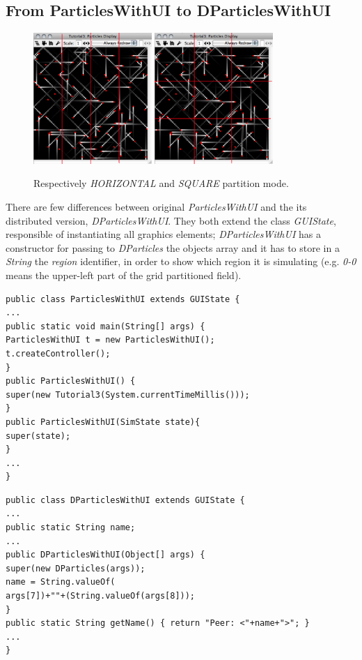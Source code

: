 \documentclass[12pt]{article}
\begin{document}
\subsection{From ParticlesWithUI to DParticlesWithUI}
\begin{figure}
\centering
\includegraphics[width=0.4\textwidth,bb=0 0 470 520]{particles-h.png} 
\includegraphics[width=0.4\textwidth,bb=0 0 470 520]{particles-m.png}
\caption{Respectively \textit{HORIZONTAL} and \textit{SQUARE} partition mode.}
\label{fig:dp01}
\end{figure}
There are few differences between original \textit{ParticlesWithUI} and the its distributed version, \textit{DParticlesWithUI}. They both extend the class \textit{GUIState}, responsible of instantiating all graphics elements; \textit{DParticlesWithUI} has a constructor for passing to \textit{DParticles} the objects array and it has to store in a \textit{String} the \textit{region} identifier, in order to show which region it is simulating (e.g. \textit{0-0} means the upper-left part of the grid partitioned field).
\begin{lstlisting}
public class ParticlesWithUI extends GUIState {
...
public static void main(String[] args) {
ParticlesWithUI t = new ParticlesWithUI();
t.createController();
}
public ParticlesWithUI() { 
super(new Tutorial3(System.currentTimeMillis()));
}
public ParticlesWithUI(SimState state){
super(state);
}
...
}
\end{lstlisting}
\medskip
{}
\begin{lstlisting}
public class DParticlesWithUI extends GUIState {
...
public static String name;
...
public DParticlesWithUI(Object[] args) {
super(new DParticles(args));
name = String.valueOf(
args[7])+""+(String.valueOf(args[8]));
}
public static String getName() { return "Peer: <"+name+">"; }
...
}
\end{lstlisting}
\end{document}
